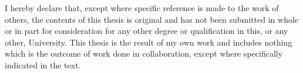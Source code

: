 
\begin{declaration}

I hereby declare that, except where specific reference is made to the work of others, the contents of this thesis is original and has not been submitted in whole or in part for consideration for any other degree or qualification in this, or any other, University. This thesis is the result of my own work and includes nothing which is the outcome of work done in collaboration, except where specifically indicated in the text.

\end{declaration}

